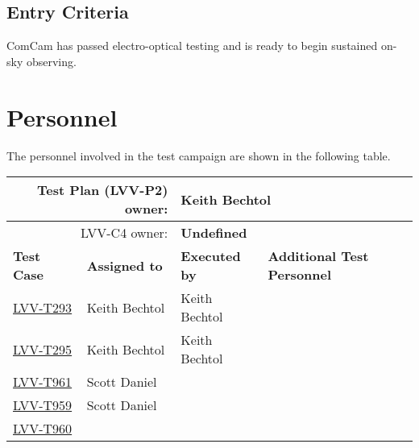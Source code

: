 \documentclass[DM,lsstdraft,STR,toc]{lsstdoc}
\begin{document}
  \subsection{Entry Criteria}
  ComCam has passed electro-optical testing and is ready to begin
sustained on-sky observing.




\newpage
\section{Personnel}
\label{sect:personnel}

The personnel involved in the test campaign are shown in the following table.

\begin{longtable}{p{3cm}p{3cm}p{3cm}p{6cm}}
\hline
\multicolumn{2}{r}{Test Plan (LVV-P2) owner:} &
\multicolumn{2}{l}{\textbf{ Keith Bechtol } }\\\hline
\multicolumn{2}{r}{ LVV-C4 owner:} &
\multicolumn{2}{l}{\textbf{
    Undefined
}
} \\\hline
\textbf{Test Case} & \textbf{Assigned to} & \textbf{Executed by} & \textbf{Additional Test Personnel} \\ \hline
\href{https://jira.lsstcorp.org/secure/Tests.jspa#/testCase/LVV-T293}{LVV-T293}
& {\small Keith Bechtol } & {\small Keith Bechtol } &
\begin{minipage}[]{6cm}
\smallskip
{\small  }
\medskip
\end{minipage}
\\ \hline
\href{https://jira.lsstcorp.org/secure/Tests.jspa#/testCase/LVV-T295}{LVV-T295}
& {\small Keith Bechtol } & {\small Keith Bechtol } &
\begin{minipage}[]{6cm}
\smallskip
{\small  }
\medskip
\end{minipage}
\\ \hline
\href{https://jira.lsstcorp.org/secure/Tests.jspa#/testCase/LVV-T961}{LVV-T961}
& {\small Scott Daniel } & {\small  } &
\begin{minipage}[]{6cm}
\smallskip
{\small  }
\medskip
\end{minipage}
\\ \hline
\href{https://jira.lsstcorp.org/secure/Tests.jspa#/testCase/LVV-T959}{LVV-T959}
& {\small Scott Daniel } & {\small  } &
\begin{minipage}[]{6cm}
\smallskip
{\small  }
\medskip
\end{minipage}
\\ \hline
\href{https://jira.lsstcorp.org/secure/Tests.jspa#/testCase/LVV-T960}{LVV-T960}

\end{longtable}
\end{document}
